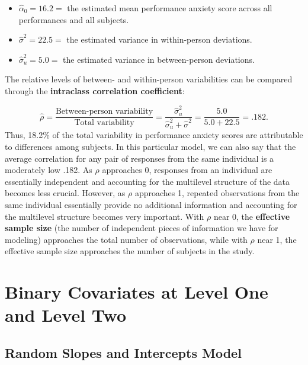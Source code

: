 \documentclass[
]{krantz}
\providecommand{\tightlist}{%
  \setlength{\itemsep}{0pt}\setlength{\parskip}{0pt}}
\begin{document}
\begin{itemize}
\tightlist
\item
  \(\hat{\alpha}_{0}=16.2=\) the estimated mean performance anxiety score across all performances and all subjects.
\item
  \(\hat{\sigma}^2=22.5=\) the estimated variance in within-person deviations.
\item
  \(\hat{\sigma}_{u}^{2}=5.0=\) the estimated variance in between-person deviations.
\end{itemize}

The relative levels of between- and within-person variabilities can be compared through the \textbf{intraclass correlation coefficient}: 

\begin{equation*}
\hat{\rho}=\frac{\textrm{Between-person variability}}{\textrm{Total variability}} = \frac{\hat{\sigma}_{u}^{2}}{\hat{\sigma}_{u}^{2}+\hat{\sigma}^2} = \frac{5.0}{5.0+22.5} = .182.
\end{equation*}
Thus, 18.2\% of the total variability in performance anxiety scores are attributable to differences among subjects. In this particular model, we can also say that the average correlation for any pair of responses from the same individual is a moderately low .182. As \(\rho\) approaches 0, responses from an individual are essentially independent and accounting for the multilevel structure of the data becomes less crucial. However, as \(\rho\) approaches 1, repeated observations from the same individual essentially provide no additional information and accounting for the multilevel structure becomes very important. With \(\rho\) near 0, the \textbf{effective sample size}  (the number of independent pieces of information we have for modeling) approaches the total number of observations, while with \(\rho\) near 1, the effective sample size approaches the number of subjects in the study.

\section{Binary Covariates at Level One and Level Two}\label{modelb}

\subsection{Random Slopes and Intercepts Model}\label{randomslopeandint}
\end{document}
